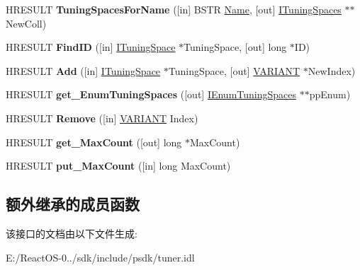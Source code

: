 \begin{DoxyCompactItemize}
\item 
\mbox{\label{interface_i_tuning_space_container_a77a2679fffb70040df537f721db0932e}} 
H\+R\+E\+S\+U\+LT {\bfseries Tuning\+Spaces\+For\+Name} (\mbox{[}in\mbox{]} B\+S\+TR \hyperlink{struct_name_rec__}{Name}, \mbox{[}out\mbox{]} \hyperlink{interface_i_tuning_spaces}{I\+Tuning\+Spaces} $\ast$$\ast$New\+Coll)
\item 
\mbox{\label{interface_i_tuning_space_container_ad4f321b359a3938913d9a13328061633}} 
H\+R\+E\+S\+U\+LT {\bfseries Find\+ID} (\mbox{[}in\mbox{]} \hyperlink{interface_i_tuning_space}{I\+Tuning\+Space} $\ast$Tuning\+Space, \mbox{[}out\mbox{]} long $\ast$ID)
\item 
\mbox{\label{interface_i_tuning_space_container_a3370aeccca573a6f0626aaaafc26eb5e}} 
H\+R\+E\+S\+U\+LT {\bfseries Add} (\mbox{[}in\mbox{]} \hyperlink{interface_i_tuning_space}{I\+Tuning\+Space} $\ast$Tuning\+Space, \mbox{[}out\mbox{]} \hyperlink{structtag_v_a_r_i_a_n_t}{V\+A\+R\+I\+A\+NT} $\ast$New\+Index)
\item 
\mbox{\label{interface_i_tuning_space_container_a2d6b9daa191f14bc2ba221d43cd939b6}} 
H\+R\+E\+S\+U\+LT {\bfseries get\+\_\+\+Enum\+Tuning\+Spaces} (\mbox{[}out\mbox{]} \hyperlink{interface_i_enum_tuning_spaces}{I\+Enum\+Tuning\+Spaces} $\ast$$\ast$pp\+Enum)
\item 
\mbox{\label{interface_i_tuning_space_container_a4ca9974a7fb50ff8ac149ef33eb73a42}} 
H\+R\+E\+S\+U\+LT {\bfseries Remove} (\mbox{[}in\mbox{]} \hyperlink{structtag_v_a_r_i_a_n_t}{V\+A\+R\+I\+A\+NT} Index)
\item 
\mbox{\label{interface_i_tuning_space_container_a1df738e58ed708f9a37d87e482fdef7f}} 
H\+R\+E\+S\+U\+LT {\bfseries get\+\_\+\+Max\+Count} (\mbox{[}out\mbox{]} long $\ast$Max\+Count)
\item 
\mbox{\label{interface_i_tuning_space_container_a4cf27d8c3239305870c1eba3998e9d63}} 
H\+R\+E\+S\+U\+LT {\bfseries put\+\_\+\+Max\+Count} (\mbox{[}in\mbox{]} long Max\+Count)
\end{DoxyCompactItemize}
\subsection*{额外继承的成员函数}


该接口的文档由以下文件生成\+:\begin{DoxyCompactItemize}
\item 
E\+:/\+React\+O\+S-\/0../sdk/include/psdk/tuner.\+idl\end{DoxyCompactItemize}
